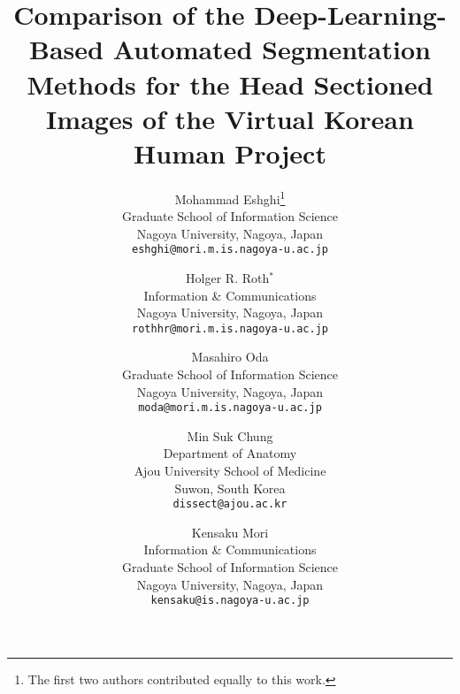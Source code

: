 \documentclass[a4paper]{mva_style}
\begin{document}
\title{Comparison of the Deep-Learning-Based Automated Segmentation Methods for the Head Sectioned Images of the Virtual Korean Human Project}



\author{
  Mohammad Eshghi\thanks{The first two authors contributed equally to this work.}\\
  Graduate School of Information Science\\
  Nagoya University, Nagoya, Japan\\
  {\tt eshghi@mori.m.is.nagoya-u.ac.jp}\\
  \and
  Holger R. Roth$^*$\\
  Information \& Communications\\
  Nagoya University, Nagoya, Japan\\
  {\tt rothhr@mori.m.is.nagoya-u.ac.jp}\\
  \and
  Masahiro Oda\\
  Graduate School of Information Science\\
 Nagoya University, Nagoya, Japan\\
  {\tt moda@mori.m.is.nagoya-u.ac.jp}\\
  \and
  Min Suk Chung\\
   Department of Anatomy\\ Ajou University School of Medicine\\
  Suwon, South Korea\\
  {\tt dissect@ajou.ac.kr}\\
  \and
  Kensaku Mori\\
  Information \& Communications\\Graduate School of Information Science\\
  Nagoya University, Nagoya, Japan\\
  {\tt kensaku@is.nagoya-u.ac.jp}\\
}

\maketitle
\end{document}
